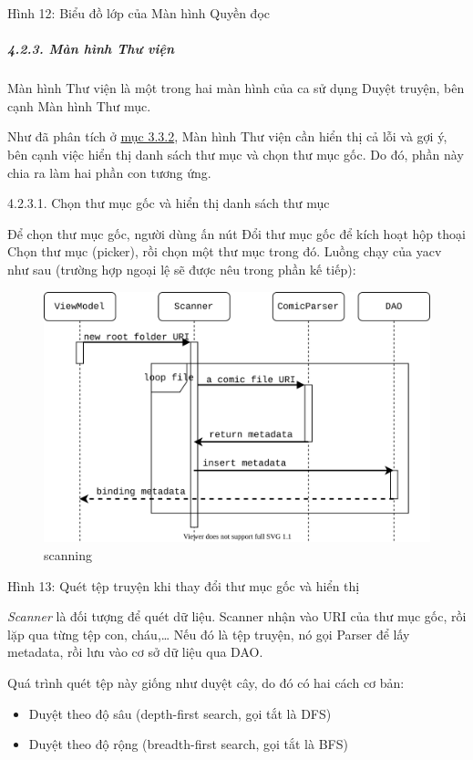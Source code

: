 \documentclass[
]{article}
\begin{document}
Hình 12: Biểu đồ lớp của Màn hình Quyền đọc

\hypertarget{muxe0n-huxecnh-thux1b0-viux1ec7n}{%
\subparagraph{\texorpdfstring{4.2.3. Màn hình Thư viện
}{4.2.3. Màn hình Thư viện }}\label{muxe0n-huxecnh-thux1b0-viux1ec7n}}

Màn hình Thư viện là một trong hai màn hình của ca sử dụng Duyệt truyện,
bên cạnh Màn hình Thư mục.

Như đã phân tích ở \protect\hyperlink{P3.3.2-show-library}{mục 3.3.2},
Màn hình Thư viện cần hiển thị cả lỗi và gợi ý, bên cạnh việc hiển thị
danh sách thư mục và chọn thư mục gốc. Do đó, phần này chia ra làm hai
phần con tương ứng.

4.2.3.1. Chọn thư mục gốc và hiển thị danh sách thư mục

Để chọn thư mục gốc, người dùng ấn nút Đổi thư mục gốc để kích hoạt hộp
thoại Chọn thư mục (picker), rồi chọn một thư mục trong đó. Luồng chạy
của yacv như sau (trường hợp ngoại lệ sẽ được nêu trong phần kế tiếp):

\begin{figure}
\centering
\includegraphics{../images/scanning_sequence.svg}
\caption{scanning}
\end{figure}

Hình 13: Quét tệp truyện khi thay đổi thư mục gốc và hiển thị

\emph{Scanner} là đối tượng để quét dữ liệu. Scanner nhận vào URI của
thư mục gốc, rồi lặp qua từng tệp con, cháu,\ldots{} Nếu đó là tệp
truyện, nó gọi Parser để lấy metadata, rồi lưu vào cơ sở dữ liệu qua
DAO.

Quá trình quét tệp này giống như duyệt cây, do đó có hai cách cơ bản:

\begin{itemize}
\item
  Duyệt theo độ sâu (depth-first search, gọi tắt là DFS)
\item
  Duyệt theo độ rộng (breadth-first search, gọi tắt là BFS)
\end{itemize}
\end{document}
